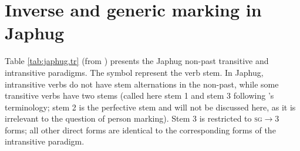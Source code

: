  
\section{Inverse and generic marking in Japhug} \label{sec:japhug}
Table \ref{tab:japhug.tr} (from  \citealt{jacques10inverse}) presents the Japhug non-past transitive and intransitive paradigms. The symbol \ro{} represent the verb stem. In Japhug, intransitive verbs do not have stem alternations in the non-past, while some transitive verbs have two stems (called here stem 1 and stem 3 following \citealt{jackson00sidaba}'s terminology; stem 2 is the perfective stem and will not be discussed here, as it is irrelevant to the question of person marking). Stem 3 is restricted to \textsc{sg}$\rightarrow$3 forms; all other direct forms are identical to the corresponding forms of the intransitive paradigm.


